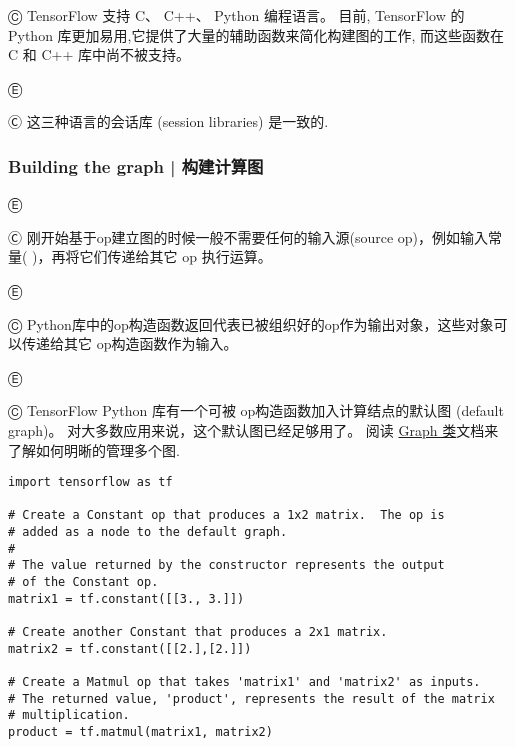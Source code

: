 Ⓒ TensorFlow 支持 C、 C++、 Python 编程语言。   目前, TensorFlow 的 Python 库更加易用,它提供了大量的辅助函数来简化构建图的工作, 而这些函数在 C 和 C++ 库中尚不被支持。

Ⓔ 

Ⓒ 这三种语言的会话库 (session libraries) 是一致的.

\subsubsection {Building the graph  |  构建计算图}

Ⓔ 

Ⓒ 刚开始基于op建立图的时候一般不需要任何的输入源(source op)，例如输入常量( )，再将它们传递给其它 op 执行运算。

Ⓔ 

Ⓒ Python库中的op构造函数返回代表已被组织好的op作为输出对象，这些对象可以传递给其它
op构造函数作为输入。

Ⓔ 

Ⓒ TensorFlow Python 库有一个可被 op构造函数加入计算结点的默认图 (default graph)。   对大多数应用来说，这个默认图已经足够用了。  阅读 \hyperref[class-tf.graph]{Graph 类}文档来了解如何明晰的管理多个图.

\begin{lstlisting}
import tensorflow as tf

# Create a Constant op that produces a 1x2 matrix.  The op is
# added as a node to the default graph.
#
# The value returned by the constructor represents the output
# of the Constant op.
matrix1 = tf.constant([[3., 3.]])

# Create another Constant that produces a 2x1 matrix.
matrix2 = tf.constant([[2.],[2.]])

# Create a Matmul op that takes 'matrix1' and 'matrix2' as inputs.
# The returned value, 'product', represents the result of the matrix
# multiplication.
product = tf.matmul(matrix1, matrix2)
\end{lstlisting}

